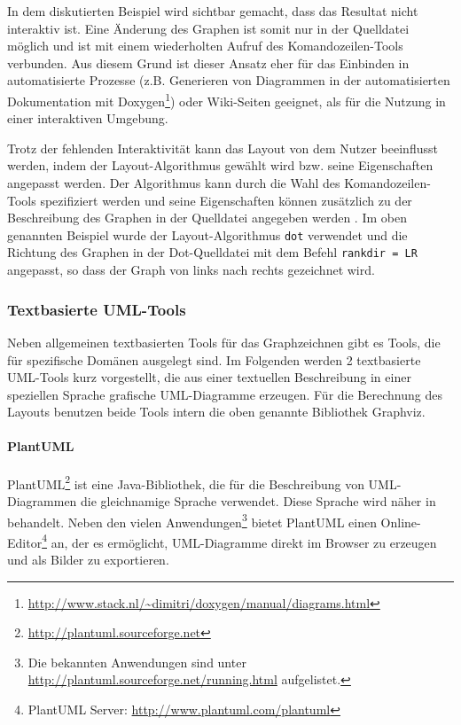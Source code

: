 In dem diskutierten Beispiel wird sichtbar gemacht, dass das Resultat nicht interaktiv ist. Eine Änderung des Graphen ist somit nur in der Quelldatei möglich und ist mit einem wiederholten Aufruf des Komandozeilen-Tools verbunden. Aus diesem Grund ist dieser Ansatz eher für das Einbinden in automatisierte Prozesse (z.B. Generieren von Diagrammen in der automatisierten Dokumentation mit Doxygen\footnote{\url{http://www.stack.nl/~dimitri/doxygen/manual/diagrams.html}}) oder Wiki-Seiten geeignet, als für die Nutzung in einer interaktiven Umgebung.

Trotz der fehlenden Interaktivität kann das Layout von dem Nutzer beeinflusst werden, indem der Layout-Algorithmus gewählt wird bzw. seine Eigenschaften angepasst werden. Der Algorithmus kann durch die Wahl des Komandozeilen-Tools spezifiziert werden und seine Eigenschaften können zusätzlich zu der Beschreibung des Graphen in der Quelldatei angegeben werden \cite{NorthGansner14Dot-Manual}. Im oben genannten Beispiel wurde der Layout-Algorithmus \lstinline{dot} verwendet und die Richtung des Graphen in der Dot-Quelldatei mit dem Befehl \lstinline{rankdir = LR} angepasst, so dass der Graph von links nach rechts gezeichnet wird.

\subsubsection{Textbasierte UML-Tools}

Neben allgemeinen textbasierten Tools für das Graphzeichnen gibt es Tools, die für spezifische Domänen ausgelegt sind. Im Folgenden werden 2 textbasierte UML-Tools kurz vorgestellt, die aus einer textuellen Beschreibung in einer speziellen Sprache grafische UML-Diagramme erzeugen. Für die Berechnung des Layouts benutzen beide Tools intern die oben genannte Bibliothek Graphviz.

\paragraph{PlantUML}


PlantUML\footnote{\url{http://plantuml.sourceforge.net}} ist eine Java-Bibliothek, die für die Beschreibung von UML-Diagrammen die gleichnamige Sprache verwendet. Diese Sprache wird näher in \cite{Roques10Drawing} behandelt. Neben den vielen Anwendungen\footnote{Die bekannten Anwendungen sind unter \url{http://plantuml.sourceforge.net/running.html} aufgelistet.} bietet PlantUML einen Online-Editor\footnote{PlantUML Server: \url{http://www.plantuml.com/plantuml}} an, der es ermöglicht, UML-Diagramme direkt im Browser zu erzeugen und als Bilder zu exportieren.

